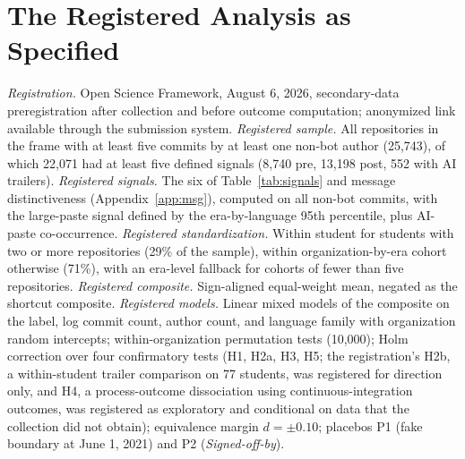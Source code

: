 \documentclass[acmsmall,screen,review,anonymous]{acmart}
\begin{document}
\appendix


\section{The Registered Analysis as Specified}
\label{app:registered}

\textit{Registration.} Open Science Framework, August 6, 2026, secondary-data preregistration after collection and before outcome computation; anonymized link available through the submission system. \textit{Registered sample.} All repositories in the frame with at least five commits by at least one non-bot author (25,743), of which 22,071 had at least five defined signals (8,740 pre, 13,198 post, 552 with AI trailers). \textit{Registered signals.} The six of Table~\ref{tab:signals} and message distinctiveness (Appendix~\ref{app:msg}), computed on all non-bot commits, with the large-paste signal defined by the era-by-language 95th percentile, plus AI-paste co-occurrence. \textit{Registered standardization.} Within student for students with two or more repositories (29\% of the sample), within organization-by-era cohort otherwise (71\%), with an era-level fallback for cohorts of fewer than five repositories. \textit{Registered composite.} Sign-aligned equal-weight mean, negated as the shortcut composite. \textit{Registered models.} Linear mixed models of the composite on the label, log commit count, author count, and language family with organization random intercepts; within-organization permutation tests (10,000); Holm correction over four confirmatory tests (H1, H2a, H3, H5; the registration's H2b, a within-student trailer comparison on 77 students, was registered for direction only, and H4, a process-outcome dissociation using continuous-integration outcomes, was registered as exploratory and conditional on data that the collection did not obtain); equivalence margin $d = \pm 0.10$; placebos P1 (fake boundary at June 1, 2021) and P2 (\textit{Signed-off-by}).
\end{document}
